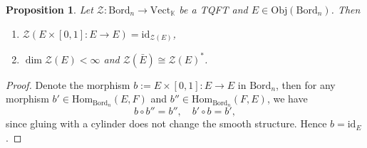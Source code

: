 \documentclass[10pt,reqno,final]{article}
\numberwithin{equation}{section}
\numberwithin{figure}{section}
\numberwithin{table}{section}
\theoremstyle{plain}
\newtheorem{proposition}[theorem]{Proposition}
\theoremstyle{definition}
\theoremstyle{remark}
\begin{document}
    \begin{proposition}
      Let \(\mathcal{Z}:\mathrm{Bord}_{n}\to \mathrm{Vect}_{\mathbb{K}}\) be a TQFT and \(E\in \mathrm{Obj}(\mathrm{Bord}_{n})\). Then 
      \begin{enumerate}[(1)]
          \item \(\mathcal{Z}(E\times [0,1]:E\to E)=\mathrm{id}_{\mathcal{Z}(E)}\),
          \item \(\dim \mathcal{Z}(E)<\infty\) and \(\mathcal{Z}(\bar{E})\cong \mathcal{Z}(E )^{*}\).
      \end{enumerate}
    \end{proposition}
    \begin{proof}
      Denote the morphism \(b:= E\times [0,1]:E\to E\) in \(\mathrm{Bord}_{n}\), then for any morphism \(b'\in \mathrm{Hom}_{\mathrm{Bord}_{n}}(E,F)\) and \(b''\in \mathrm{Hom}_{\mathrm{Bord}_{n}}(F,E)\),  we have 
      \[
        b\circ b''=b'', \quad b'\circ b=b',
      \]
      since gluing with a cylinder does not change the smooth structure. Hence \(b=\mathrm{id}_{E}\).


\end{proof}
\end{document}
